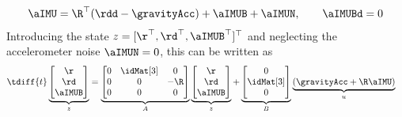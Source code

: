 \begin{align}
 \aIMU = \R^\top(\rdd - \gravityAcc) + \aIMUB + \aIMUN,
\qquad
 \aIMUBd = 0
\end{align}
Introducing the state $z = [\r^\top, \rd^\top, \aIMUB^\top]^\top$ and neglecting the accelerometer noise $\aIMUN=0$, this can be written as
\begin{align}\label{eq:AccelerometerDynamicsState}
 \tdiff{t}
 \underbrace{\begin{bmatrix} \r \\ \rd \\ \aIMUB \end{bmatrix}}_{z}
 &=
 \underbrace{\begin{bmatrix} 0 & \idMat[3] & 0 \\ 0 & 0 & -\R \\ 0 & 0 & 0 \end{bmatrix}}_{A}
 \underbrace{\begin{bmatrix} \r \\ \rd \\ \aIMUB \end{bmatrix}}_{z}
 +
 \underbrace{\begin{bmatrix} 0 \\ \idMat[3] \\ 0 \end{bmatrix}}_{B}
 \underbrace{(\gravityAcc + \R \aIMU)}_{u}
\end{align}

